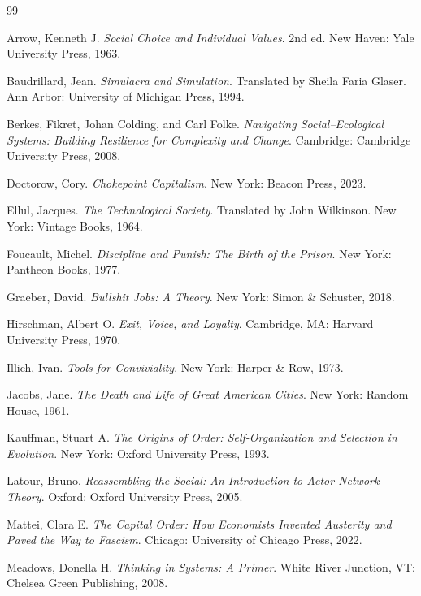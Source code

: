 \documentclass[11pt, letterpaper]{article}
\begin{document}
\newpage
\begin{thebibliography}{99}

Arrow, Kenneth J.
\textit{Social Choice and Individual Values}.
2nd ed.
New Haven: Yale University Press, 1963.

Baudrillard, Jean.
\textit{Simulacra and Simulation}.
Translated by Sheila Faria Glaser.
Ann Arbor: University of Michigan Press, 1994.

Berkes, Fikret, Johan Colding, and Carl Folke.
\textit{Navigating Social--Ecological Systems: Building Resilience for Complexity and Change}.
Cambridge: Cambridge University Press, 2008.

Doctorow, Cory.
\textit{Chokepoint Capitalism}.
New York: Beacon Press, 2023.

Ellul, Jacques.
\textit{The Technological Society}.
Translated by John Wilkinson.
New York: Vintage Books, 1964.

Foucault, Michel.
\textit{Discipline and Punish: The Birth of the Prison}.
New York: Pantheon Books, 1977.

Graeber, David.
\textit{Bullshit Jobs: A Theory}.
New York: Simon \& Schuster, 2018.

Hirschman, Albert O.
\textit{Exit, Voice, and Loyalty}.
Cambridge, MA: Harvard University Press, 1970.

Illich, Ivan.
\textit{Tools for Conviviality}.
New York: Harper \& Row, 1973.

Jacobs, Jane.
\textit{The Death and Life of Great American Cities}.
New York: Random House, 1961.

Kauffman, Stuart A.
\textit{The Origins of Order: Self-Organization and Selection in Evolution}.
New York: Oxford University Press, 1993.

Latour, Bruno.
\textit{Reassembling the Social: An Introduction to Actor-Network-Theory}.
Oxford: Oxford University Press, 2005.

Mattei, Clara E.
\textit{The Capital Order: How Economists Invented Austerity and Paved the Way to Fascism}.
Chicago: University of Chicago Press, 2022.

Meadows, Donella H.
\textit{Thinking in Systems: A Primer}.
White River Junction, VT: Chelsea Green Publishing, 2008.


\end{thebibliography}
\end{document}
